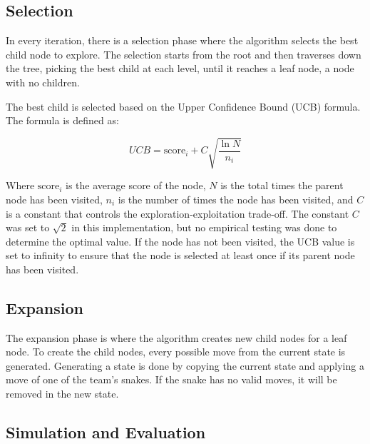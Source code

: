 \documentclass[a4paper,12pt]{article}
\begin{document}

\subsection{Selection}
In every iteration, there is a selection phase where the algorithm selects the best child node to explore. The selection starts from the root and then traverses down the tree, picking the best child at each level, until it reaches a leaf node, a node with no children.


The best child is selected based on the Upper Confidence Bound (UCB) formula. The formula is defined as:

\begin{equation} \label{eq:ucb}
    UCB = \text{score}_i + C \sqrt{\frac{\ln{N}}{n_i}}
\end{equation}

Where $\text{score}_i$ is the average score of the node, $N$ is the total times the parent node has been visited, $n_i$ is the number of times the node has been visited, and $C$ is a constant that controls the exploration-exploitation trade-off. The constant $C$ was set to $\sqrt{2}$ in this implementation, but no empirical testing was done to determine the optimal value. If the node has not been visited, the UCB value is set to infinity to ensure that the node is selected at least once if its parent node has been visited.


\subsection{Expansion}

The expansion phase is where the algorithm creates new child nodes for a leaf node. To create the child nodes, every possible move from the current state is generated. Generating a state is done by copying the current state and applying a move of one of the team's snakes. If the snake has no valid moves, it will be removed in the new state. 



\subsection{Simulation and Evaluation}
\end{document}
